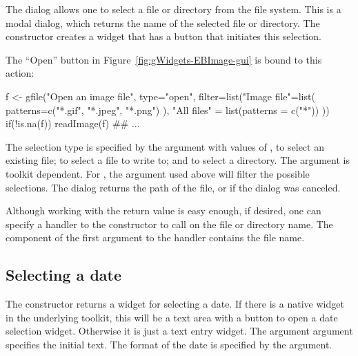 The  dialog allows one to select a file or directory
from the file system. This is a modal dialog, which returns the name
of the selected file or directory. The 
constructor creates a widget that has a button that
initiates this selection.  

The ``Open'' button in Figure~\ref{fig:gWidgets-EBImage-gui} is bound
to this action:


\begin{Schunk}
\begin{Sinput}
 f <- gfile("Open an image file",
            type="open",
            filter=list("Image file"=list(
                          patterns=c("*.gif", "*.jpeg", "*.png")
                          ),
              "All files" = list(patterns = c("*"))
              ))
 if(!is.na(f)) 
   readImage(f) ## ...
\end{Sinput}
\end{Schunk}


The selection type is specified by the  argument with
values of , to select an existing file;  to
select a file to write to; and  to select a
directory. The  argument is toolkit
dependent. For , the  argument
used above will filter the possible selections. The dialog returns
the path of the file, or  if the dialog was canceled.

Although working with the return value is easy enough, if desired, one can specify a
handler to the constructor to call on the file or directory name. The
component  of the first argument to the handler contains
the file name.




\subsection{Selecting a date}
\label{sec:gWidgets-selecting-date}

The  constructor returns a widget for selecting
a date. If there is a native widget in the underlying toolkit, this
will be a text area with a button to open a date selection
widget. Otherwise it is just a text entry widget.  The argument
 argument specifies the initial text. The
format of the date is specified by the 
argument.

